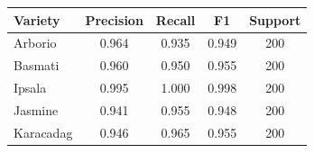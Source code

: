 \begin{tabular}{@{}lcccc@{}}
\toprule
Variety & Precision & Recall & F1 & Support \\
\midrule
Arborio & 0.964 & 0.935 & 0.949 & 200 \\
Basmati & 0.960 & 0.950 & 0.955 & 200 \\
Ipsala & 0.995 & 1.000 & 0.998 & 200 \\
Jasmine & 0.941 & 0.955 & 0.948 & 200 \\
Karacadag & 0.946 & 0.965 & 0.955 & 200 \\
\bottomrule
\end{tabular}
